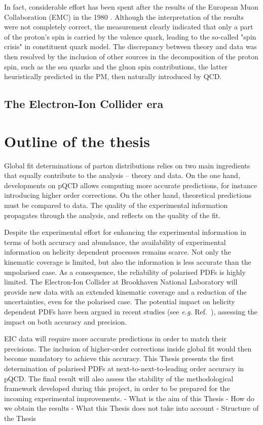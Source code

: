In fact, considerable effort has been spent after the results of the European Muon Collaboration (EMC) in the 1980 \cite{EuropeanMuon:1989yki}. Although the interpretation of the results were not completely correct, the measurement clearly indicated that only a part of the proton's spin is carried by the valence quark, leading to the so-called "spin crisis" in constituent quark model. The discrepancy between theory and data was then resolved by the inclusion of other sources in the decomposition of the proton spin, such as the sea quarks and the gluon spin contributions, the latter heuristically predicted in the PM, then naturally introduced by QCD.\par

\subsection*{The Electron-Ion Collider era}


\section{Outline of the thesis}

Global fit determinations of parton distributions relies on two main ingredients that equally contribute to the analysis -- theory and data. On the one hand, developments on pQCD allows computing more accurate predictions, for instance introducing higher order corrections. On the other hand, theoretical predictions must be compared to data. The quality of the experimental information propagates through the analysis, and reflects on the quality of the fit.%

Despite the experimental effort for enhancing the experimental information in terms of both accuracy and abundance, the availability of experimental information on helicity dependent processes remains scarce. Not only the kinematic coverage is limited, but also the information is less accurate than the unpolarised case. As a consequence, the reliability of polarised PDFs is highly limited. The Electron-Ion Collider at Brookhaven National Laboratory \cite{AbdulKhalek:2021gbh} will provide new data with an extended kinematic coverage and a reduction of the uncertainties, even for the polarised case. The potential impact on helicity dependent PDFs have been argued in recent studies (see \textit{e.g.} Ref.~\cite{Borsa:2020lsz}), assessing the impact on both accuracy and precision.%

EIC data will require more accurate predictions in order to match their precisions. The inclusion of higher-order corrections inside global fit would then become mandatory to achieve this accuracy. This Thesis presents the first determination of polarised PDFs at next-to-next-to-leading order accuracy in pQCD. The final result will also assess the stability of the methodological framework developed during this project, in order to be prepared for the incoming experimental improvements.   
- What is the aim of this Thesis
- How do we obtain the results
- What this Thesis does not take into account
- Structure of the Thesis